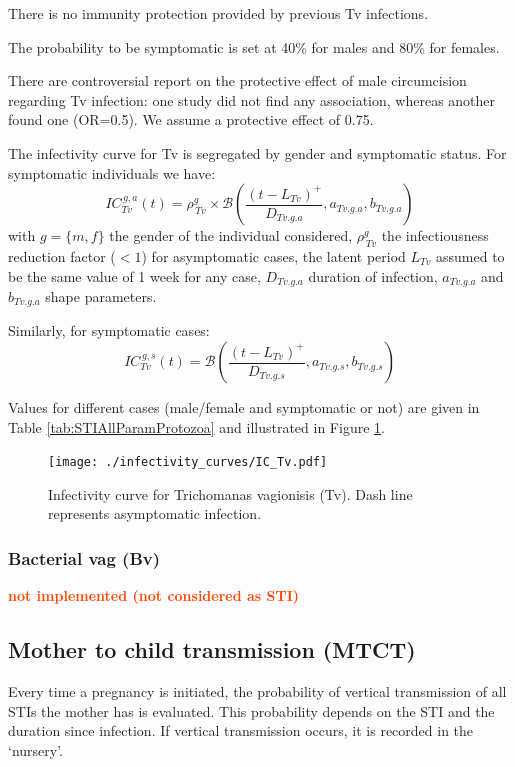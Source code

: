\documentclass[11pt, onecolumn]{article}
\newcommand{\warning}[1]{\textbf{\textcolor{OrangeRed}{#1}}}
\begin{document}
There is no immunity protection provided by previous Tv infections.

The probability to be symptomatic is set at 40\% for males and 80\% for females.

There are controversial report on the protective effect of male circumcision regarding Tv infection: one study \cite{Mehta:2009bh} did not find any association, whereas another \cite{SobngwiTambekou:2008fs} found one (OR=0.5). We assume a protective effect of 0.75. 

The infectivity curve for Tv is segregated by gender and symptomatic status. For symptomatic individuals we have:
$$IC_{Tv}^{\,g,a}(t) =  \rho_{\,Tv}^g \times\mathcal{B}\left(\frac{(t-L_{Tv})^+}{D_{Tv.g.a}},a_{Tv.g.a},b_{Tv.g.a}\right)  $$
with $g=\{m,f\}$ the gender of the individual considered, $\rho_{\,Tv}^g$ the infectiousness reduction factor ($<1$) for asymptomatic cases, the latent period $L_{Tv}$ assumed to be the same value of 1 week for any case, $D_{Tv.g.a}$ duration of infection, $a_{Tv.g.a}$ and $b_{Tv.g.a}$ shape parameters. 

Similarly, for symptomatic cases:
$$IC_{Tv}^{\,g,s}(t) = \mathcal{B}\left(\frac{(t-L_{Tv})^+}{D_{Tv.g.s}},a_{Tv.g.s},b_{Tv.g.s}\right)  $$

Values for different cases (male/female and symptomatic or not) are given in Table \ref{tab:STIAllParamProtozoa} and illustrated in Figure \ref{fig:ICTv}.

\begin{figure}[!ht]
\centering
   \texttt{[image: ./infectivity\_curves/IC\_Tv.pdf]}
\caption{Infectivity curve for Trichomanas vagionisis (Tv). Dash line represents asymptomatic infection.}
\label{fig:ICTv}
\end{figure}


\subsubsection{Bacterial vag (Bv)}
\warning{not implemented (not considered as STI)}

\subsection{Mother to child transmission (MTCT)}

Every time a pregnancy is initiated, the probability of vertical transmission of all STIs the mother has is evaluated. This probability depends on the STI and the duration since infection. If vertical transmission occurs, it is recorded in the `nursery'.
\end{document}
